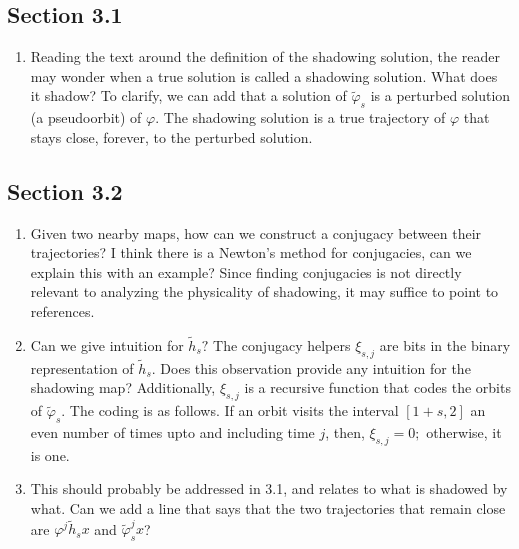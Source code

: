 \documentclass[12pt]{article}
\begin{document}
\subsection*{Section 3.1}
\begin{enumerate}
    \item Reading the text around the definition of the shadowing solution, 
    the reader may wonder when a true solution is called a shadowing solution.
    What does it shadow? To clarify, we can add that a solution of $\tilde{\varphi}_s$
    is a perturbed solution (a pseudoorbit) of $\varphi.$ The shadowing solution 
    is a true trajectory of $\varphi$ that stays close, forever, to the perturbed solution.
\end{enumerate}
\subsection*{Section 3.2}
\begin{enumerate}
    \item Given two nearby maps, how can we construct a conjugacy between their trajectories?
    I think there is a Newton's method for conjugacies, can we explain this with an example?
    Since finding conjugacies is not directly relevant to analyzing the physicality of shadowing, it may suffice to point to references. 
    \item Can we give intuition for $\tilde{h}_s?$ The conjugacy helpers $\xi_{s, j}$
    are bits in the binary representation of $\tilde{h}_s.$ Does this observation provide 
    any intuition for the shadowing map? Additionally, $\xi_{s, j}$ is a recursive function that codes the orbits of $\tilde{\varphi}_s.$ The coding is as follows. If an orbit 
    visits the interval $[1+s, 2]$ an even number of times upto and including time $j$,
    then, $\xi_{s,j} =0;$ otherwise, it is one.
    \item This should probably be addressed in 3.1, and relates to what is shadowed by what.
    Can we add a line that says that the two trajectories that remain close are 
    $\varphi^j \tilde{h}_s x$ and $\tilde{\varphi}^j_s x$?
\end{enumerate}
\end{document}
